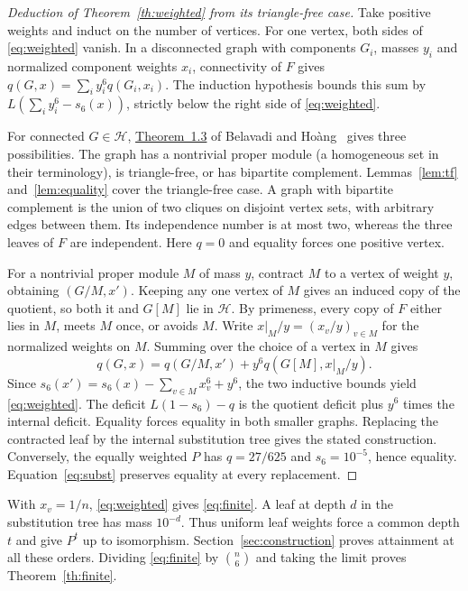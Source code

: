 \documentclass[11pt,a4paper]{article}
\newcommand{\BH}{\mathcal H}
\begin{document}
\begin{proof}[Deduction of Theorem~\ref{th:weighted} from its triangle-free case]
Take positive weights and induct on the number of vertices. For one vertex, both sides of \eqref{eq:weighted} vanish. In a disconnected graph with components \(G_i\), masses \(y_i\) and normalized component weights \(x_i\), connectivity of \(F\) gives \(q(G,x)=\sum_i y_i^6q(G_i,x_i)\). The induction hypothesis bounds this sum by \(L(\sum_i y_i^6-s_6(x))\), strictly below the right side of \eqref{eq:weighted}.

For connected \(G\in\BH\), \href{https://arxiv.org/html/2604.27594v3#S1.Thmtheorem3}{Theorem~1.3} of Belavadi and Ho\`ang~\cite{bh} gives three possibilities. The graph has a nontrivial proper module (a homogeneous set in their terminology), is triangle-free, or has bipartite complement. Lemmas~\ref{lem:tf} and~\ref{lem:equality} cover the triangle-free case. A graph with bipartite complement is the union of two cliques on disjoint vertex sets, with arbitrary edges between them. Its independence number is at most two, whereas the three leaves of \(F\) are independent. Here \(q=0\) and equality forces one positive vertex.

For a nontrivial proper module \(M\) of mass \(y\), contract \(M\) to a vertex of weight \(y\), obtaining \((G/M,x')\). Keeping any one vertex of \(M\) gives an induced copy of the quotient, so both it and \(G[M]\) lie in \(\BH\). By primeness, every copy of \(F\) either lies in \(M\), meets \(M\) once, or avoids \(M\). Write \(x|_M/y=(x_v/y)_{v\in M}\) for the normalized weights on \(M\). Summing over the choice of a vertex in \(M\) gives
\begin{equation}\label{eq:subst}
 q(G,x)=q(G/M,x')+y^6 q(G[M],x|_M/y).
\end{equation}
Since \(s_6(x')=s_6(x)-\sum_{v\in M}x_v^6+y^6\), the two inductive bounds yield \eqref{eq:weighted}. The deficit \(L(1-s_6)-q\) is the quotient deficit plus \(y^6\) times the internal deficit. Equality forces equality in both smaller graphs. Replacing the contracted leaf by the internal substitution tree gives the stated construction. Conversely, the equally weighted \(P\) has \(q=27/625\) and \(s_6=10^{-5}\), hence equality. Equation~\eqref{eq:subst} preserves equality at every replacement.
\end{proof}

With \(x_v=1/n\), \eqref{eq:weighted} gives \eqref{eq:finite}. A leaf at depth \(d\) in the substitution tree has mass \(10^{-d}\). Thus uniform leaf weights force a common depth \(t\) and give \(P^t\) up to isomorphism. Section~\ref{sec:construction} proves attainment at all these orders. Dividing \eqref{eq:finite} by \(\binom n6\) and taking the limit proves Theorem~\ref{th:finite}.
\end{document}
